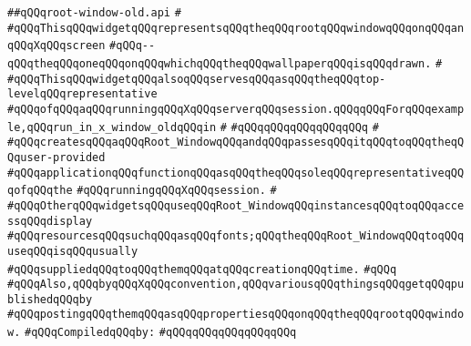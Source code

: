\label{src/lib/x-kit/widget/old/basic/root-window-old.api}
\verb|##qQQqroot-window-old.api|\newline
\verb|#|\newline
\verb|#qQQqThisqQQqwidgetqQQqrepresentsqQQqtheqQQqrootqQQqwindowqQQqonqQQqanqQQqXqQQqscreen|\newline
\verb|#qQQq--qQQqtheqQQqoneqQQqonqQQqwhichqQQqtheqQQqwallpaperqQQqisqQQqdrawn.|\newline
\verb|#|\newline
\verb|#qQQqThisqQQqwidgetqQQqalsoqQQqservesqQQqasqQQqtheqQQqtop-levelqQQqrepresentative|\newline
\verb|#qQQqofqQQqaqQQqrunningqQQqXqQQqserverqQQqsession.qQQqqQQqForqQQqexample,qQQqrun_in_x_window_oldqQQqin|\newline
\verb|#|\newline
\verb|#qQQqqQQqqQQqqQQqqQQq|\newline
\verb|#|\newline
\verb|#qQQqcreatesqQQqaqQQqRoot_WindowqQQqandqQQqpassesqQQqitqQQqtoqQQqtheqQQquser-provided|\newline
\verb|#qQQqapplicationqQQqfunctionqQQqasqQQqtheqQQqsoleqQQqrepresentativeqQQqofqQQqthe|\newline
\verb|#qQQqrunningqQQqXqQQqsession.|\newline
\verb|#|\newline
\verb|#qQQqOtherqQQqwidgetsqQQquseqQQqRoot_WindowqQQqinstancesqQQqtoqQQqaccessqQQqdisplay|\newline
\verb|#qQQqresourcesqQQqsuchqQQqasqQQqfonts;qQQqtheqQQqRoot_WindowqQQqtoqQQquseqQQqisqQQqusually|\newline
\verb|#qQQqsuppliedqQQqtoqQQqthemqQQqatqQQqcreationqQQqtime.|\newline
\verb|#qQQq|\newline
\verb|#qQQqAlso,qQQqbyqQQqXqQQqconvention,qQQqvariousqQQqthingsqQQqgetqQQqpublishedqQQqby|\newline
\verb|#qQQqpostingqQQqthemqQQqasqQQqpropertiesqQQqonqQQqtheqQQqrootqQQqwindow.|\newline
\newline
\verb|#qQQqCompiledqQQqby:|\newline
\verb|#qQQqqQQqqQQqqQQqqQQq|\newline
\newline
